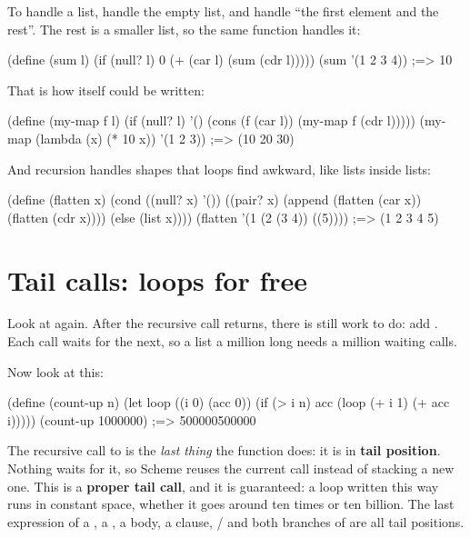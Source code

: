 To handle a list, handle the empty list, and handle ``the first element and
the rest''. The rest is a smaller list, so the same function handles it:

\begin{scm}
(define (sum l)
  (if (null? l)
      0
      (+ (car l) (sum (cdr l)))))
(sum '(1 2 3 4))                     ;=> 10
\end{scm}

That is how  itself could be written:

\begin{scm}
(define (my-map f l)
  (if (null? l)
      '()
      (cons (f (car l)) (my-map f (cdr l)))))
(my-map (lambda (x) (* 10 x)) '(1 2 3))    ;=> (10 20 30)
\end{scm}

And recursion handles shapes that loops find awkward, like lists inside
lists:

\begin{scm}
(define (flatten x)
  (cond ((null? x) '())
        ((pair? x) (append (flatten (car x)) (flatten (cdr x))))
        (else (list x))))
(flatten '(1 (2 (3 4)) ((5))))       ;=> (1 2 3 4 5)
\end{scm}

\section{Tail calls: loops for free}

Look at  again. After the recursive call returns, there is still
work to do: add . Each call waits for the next, so a list a
million long needs a million waiting calls.

Now look at this:

\begin{scm}
(define (count-up n)
  (let loop ((i 0) (acc 0))
    (if (> i n)
        acc
        (loop (+ i 1) (+ acc i)))))
(count-up 1000000)                   ;=> 500000500000
\end{scm}

The recursive call to  is the \emph{last thing} the function
does: it is in \textbf{tail position}. Nothing waits for it, so Scheme
reuses the current call instead of stacking a new one. This is a
\textbf{proper tail call}, and it is guaranteed: a loop written this way
runs in constant space, whether it goes around ten times or ten billion.
The last expression of a , a , a 
body, a  clause, / and both branches of
 are all tail positions.

